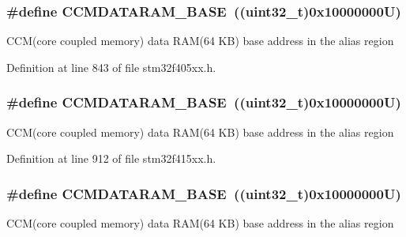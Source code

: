 \subsubsection[{\texorpdfstring{C\+C\+M\+D\+A\+T\+A\+R\+A\+M\+\_\+\+B\+A\+SE}{CCMDATARAM_BASE}}]{\setlength{\rightskip}{0pt plus 5cm}\#define C\+C\+M\+D\+A\+T\+A\+R\+A\+M\+\_\+\+B\+A\+SE~((uint32\+\_\+t)0x10000000\+U)}\hypertarget{group___peripheral__registers__structures_gabea1f1810ebeac402164b42ab54bcdf9}{}\label{group___peripheral__registers__structures_gabea1f1810ebeac402164b42ab54bcdf9}
C\+C\+M(core coupled memory) data R\+A\+M(64 K\+B) base address in the alias region 

Definition at line 843 of file stm32f405xx.\+h.

\subsubsection[{\texorpdfstring{C\+C\+M\+D\+A\+T\+A\+R\+A\+M\+\_\+\+B\+A\+SE}{CCMDATARAM_BASE}}]{\setlength{\rightskip}{0pt plus 5cm}\#define C\+C\+M\+D\+A\+T\+A\+R\+A\+M\+\_\+\+B\+A\+SE~((uint32\+\_\+t)0x10000000\+U)}\hypertarget{group___peripheral__registers__structures_gabea1f1810ebeac402164b42ab54bcdf9}{}\label{group___peripheral__registers__structures_gabea1f1810ebeac402164b42ab54bcdf9}
C\+C\+M(core coupled memory) data R\+A\+M(64 K\+B) base address in the alias region 

Definition at line 912 of file stm32f415xx.\+h.

\subsubsection[{\texorpdfstring{C\+C\+M\+D\+A\+T\+A\+R\+A\+M\+\_\+\+B\+A\+SE}{CCMDATARAM_BASE}}]{\setlength{\rightskip}{0pt plus 5cm}\#define C\+C\+M\+D\+A\+T\+A\+R\+A\+M\+\_\+\+B\+A\+SE~((uint32\+\_\+t)0x10000000\+U)}\hypertarget{group___peripheral__registers__structures_gabea1f1810ebeac402164b42ab54bcdf9}{}\label{group___peripheral__registers__structures_gabea1f1810ebeac402164b42ab54bcdf9}
C\+C\+M(core coupled memory) data R\+A\+M(64 K\+B) base address in the alias region 

